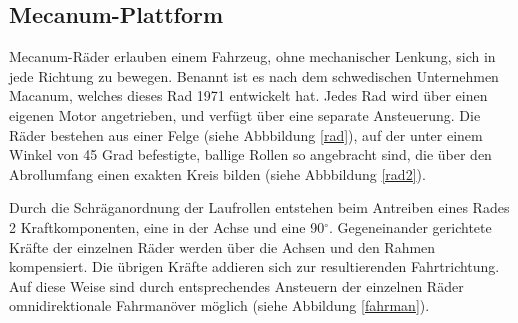\documentclass[a4paper,bibtotoc,oneside]{scrbook}
\begin{document}
\subsection{Mecanum-Plattform}\thispagestyle{empty}
Mecanum-Räder erlauben einem Fahrzeug, ohne mechanischer Lenkung, sich in jede Richtung zu bewegen. Benannt ist es nach dem schwedischen Unternehmen Macanum, welches dieses Rad 1971 entwickelt hat.
Jedes Rad wird über einen eigenen Motor angetrieben, und verfügt über eine separate Ansteuerung. Die Räder bestehen aus einer Felge (siehe Abbbildung \ref{rad}), auf der unter einem Winkel von 45 Grad befestigte, ballige Rollen so angebracht sind, die über den Abrollumfang einen exakten Kreis bilden (siehe Abbbildung \ref{rad2}).

Durch die Schräganordnung der Laufrollen entstehen beim Antreiben eines Rades 2 Kraftkomponenten, eine in der Achse  und eine 90$^\circ$. Gegeneinander gerichtete Kräfte der einzelnen Räder werden über die Achsen und den Rahmen kompensiert. Die übrigen Kräfte addieren sich zur resultierenden Fahrtrichtung. Auf diese Weise sind durch entsprechendes Ansteuern der einzelnen Räder omnidirektionale Fahrmanöver möglich (siehe Abbildung \ref{fahrman}).
\end{document}

